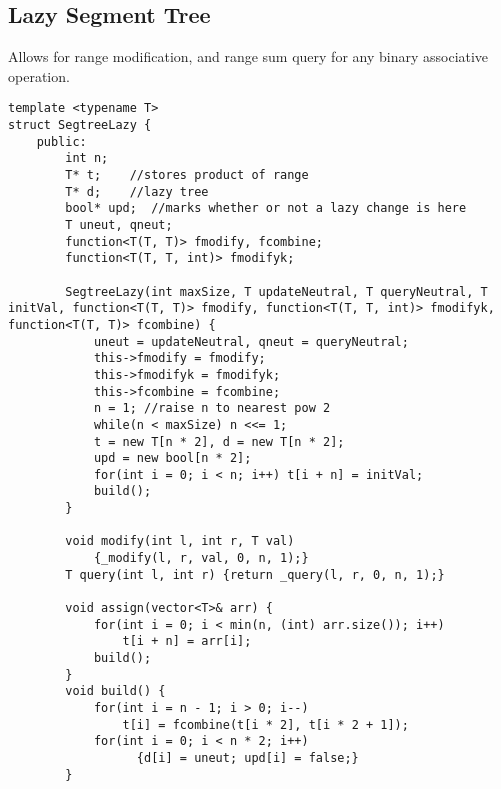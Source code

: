 \documentclass[8pt, headheight=10pt, a4paper]{article}
\begin{document}
\begin{multicols*}{3}
\subsection{Lazy Segment Tree}
Allows for range modification, and range sum query for any binary associative operation. 
\begin{lstlisting}
template <typename T>
struct SegtreeLazy {
    public:
        int n;
        T* t;    //stores product of range
        T* d;    //lazy tree
        bool* upd;  //marks whether or not a lazy change is here
        T uneut, qneut;
        function<T(T, T)> fmodify, fcombine;
        function<T(T, T, int)> fmodifyk;

        SegtreeLazy(int maxSize, T updateNeutral, T queryNeutral, T initVal, function<T(T, T)> fmodify, function<T(T, T, int)> fmodifyk, function<T(T, T)> fcombine) {
            uneut = updateNeutral, qneut = queryNeutral;
            this->fmodify = fmodify;
            this->fmodifyk = fmodifyk;
            this->fcombine = fcombine;
            n = 1; //raise n to nearest pow 2
            while(n < maxSize) n <<= 1;
            t = new T[n * 2], d = new T[n * 2];
            upd = new bool[n * 2];
            for(int i = 0; i < n; i++) t[i + n] = initVal;
            build();
        }
	
        void modify(int l, int r, T val) 
            {_modify(l, r, val, 0, n, 1);}
        T query(int l, int r) {return _query(l, r, 0, n, 1);}

        void assign(vector<T>& arr) {
            for(int i = 0; i < min(n, (int) arr.size()); i++) 
                t[i + n] = arr[i];
            build();
        }
        void build() {
            for(int i = n - 1; i > 0; i--) 
                t[i] = fcombine(t[i * 2], t[i * 2 + 1]);
            for(int i = 0; i < n * 2; i++)
            	  {d[i] = uneut; upd[i] = false;}
        }


\end{lstlisting}
\end{multicols*}
\end{document}
